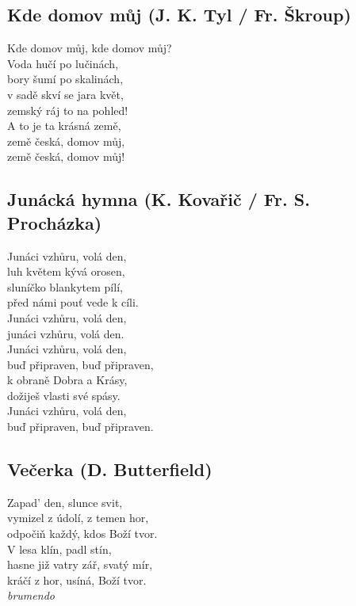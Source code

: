 \newpage
\pagestyle{empty}
\begin{center}
\subsection*{Kde domov můj (J. K. Tyl / Fr. Škroup)}
Kde domov můj, kde domov můj?\\
Voda hučí po lučinách,\\
bory šumí po skalinách,\\
v sadě skví se jara květ,\\
zemský ráj to na pohled!\\
A to je ta krásná země,\\
země česká, domov můj,\\
země česká, domov můj!

\subsection*{Junácká hymna (K. Kovařič / Fr. S. Procházka)}
Junáci vzhůru, volá den,\\
luh květem kývá orosen,\\
sluníčko blankytem pílí,\\
před námi pouť vede k cíli.\\
Junáci vzhůru, volá den,\\
junáci vzhůru, volá den.\\[1em]
Junáci vzhůru, volá den,\\
buď připraven, buď připraven,\\
k obraně Dobra a Krásy,\\
dožiješ vlasti své spásy.\\
Junáci vzhůru, volá den,\\
buď připraven, buď připraven.

\subsection*{Večerka (D. Butterfield)}
Zapad' den, slunce svit,\\
vymizel z údolí, z temen hor,\\
odpočiň každý, kdos Boží tvor.\\[1em]
V lesa klín, padl stín,\\
hasne již vatry zář, svatý mír,\\
kráčí z hor, usíná, Boží tvor.\\[1em]
\textit{brumendo}
\end{center}
